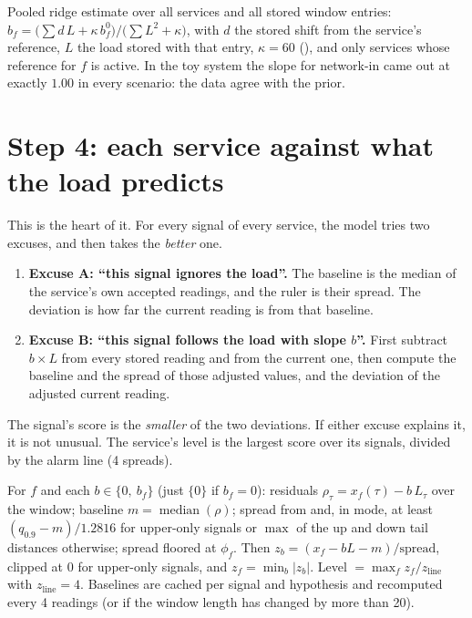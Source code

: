 \begin{techbox}
Pooled ridge estimate over all services and all stored window entries: $b_f=\bigl(\sum d\,L+\kappa\,b^0_f\bigr)/\bigl(\sum L^2+\kappa\bigr)$, with $d$ the stored shift from the service's reference, $L$ the load stored with that entry, $\kappa=60$ (), and only services whose reference for $f$ is active. In the toy system the slope for network-in came out at exactly $1.00$ in every scenario: the data agree with the prior.
\end{techbox}

\section{Step 4: each service against what the load predicts}
\begin{simplebox}
This is the heart of it. For every signal of every service, the model tries two excuses, and then takes the \emph{better} one.

\begin{enumerate}
\item \textbf{Excuse A: ``this signal ignores the load''.} The baseline is the median of the service's own accepted readings, and the ruler is their spread. The deviation is how far the current reading is from that baseline.
\item \textbf{Excuse B: ``this signal follows the load with slope $b$''.} First subtract $b\times L$ from every stored reading and from the current one, then compute the baseline and the spread of those adjusted values, and the deviation of the adjusted current reading.
\end{enumerate}

The signal's score is the \emph{smaller} of the two deviations. If either excuse explains it, it is not unusual. The service's level is the largest score over its signals, divided by the alarm line (4 spreads).
\end{simplebox}

\begin{techbox}
For $f$ and each $b\in\{0,\ b_f\}$ (just $\{0\}$ if $b_f=0$): residuals $\rho_\tau=x_f(\tau)-b\,L_\tau$ over the window; baseline $m=\operatorname{median}(\rho)$; spread from  and, in  mode, at least $(q_{0.9}-m)/1.2816$ for upper-only signals or $\max$ of the up and down tail distances otherwise; spread floored at $\phi_f$. Then $z_b=(x_f-bL-m)/\text{spread}$, clipped at $0$ for upper-only signals, and $z_f=\min_b|z_b|$. Level $=\max_f z_f/z_{\text{line}}$ with $z_{\text{line}}=4$. Baselines are cached per signal and hypothesis and recomputed every 4 readings (or if the window length has changed by more than 20).
\end{techbox}

